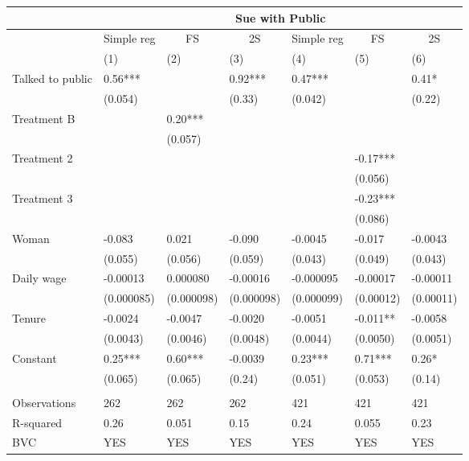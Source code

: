 \begin{tabular}{lllllll}
\toprule
      & \multicolumn{6}{c}{Sue with Public} \\
\midrule
\midrule
      & Simple reg & \multicolumn{1}{c}{FS} & \multicolumn{1}{c}{2S} & Simple reg & \multicolumn{1}{c}{FS} & \multicolumn{1}{c}{2S} \\
\midrule
      & (1)   & (2)   & (3)   & (4)   & (5)   & (6) \\
\midrule
\midrule
Talked to public & 0.56*** &       & 0.92*** & 0.47*** &       & 0.41* \\
      & (0.054) &       & (0.33) & (0.042) &       & (0.22) \\
Treatment B &       & 0.20*** &       &       &       &  \\
      &       & (0.057) &       &       &       &  \\
Treatment 2 &       &       &       &       & -0.17*** &  \\
      &       &       &       &       & (0.056) &  \\
Treatment 3 &       &       &       &       & -0.23*** &  \\
      &       &       &       &       & (0.086) &  \\
Woman & -0.083 & 0.021 & -0.090 & -0.0045 & -0.017 & -0.0043 \\
      & (0.055) & (0.056) & (0.059) & (0.043) & (0.049) & (0.043) \\
Daily wage & -0.00013 & 0.000080 & -0.00016 & -0.000095 & -0.00017 & -0.00011 \\
      & (0.000085) & (0.000098) & (0.000098) & (0.000099) & (0.00012) & (0.00011) \\
Tenure & -0.0024 & -0.0047 & -0.0020 & -0.0051 & -0.011** & -0.0058 \\
      & (0.0043) & (0.0046) & (0.0048) & (0.0044) & (0.0050) & (0.0051) \\
Constant & 0.25*** & 0.60*** & -0.0039 & 0.23*** & 0.71*** & 0.26* \\
      & (0.065) & (0.065) & (0.24) & (0.051) & (0.053) & (0.14) \\
      &       &       &       &       &       &  \\
\midrule
Observations & 262   & 262   & 262   & 421   & 421   & 421 \\
R-squared & 0.26  & 0.051 & 0.15  & 0.24  & 0.055 & 0.23 \\
BVC   & YES   & YES   & YES   & YES   & YES   & YES \\
\bottomrule
\bottomrule
\end{tabular}%
